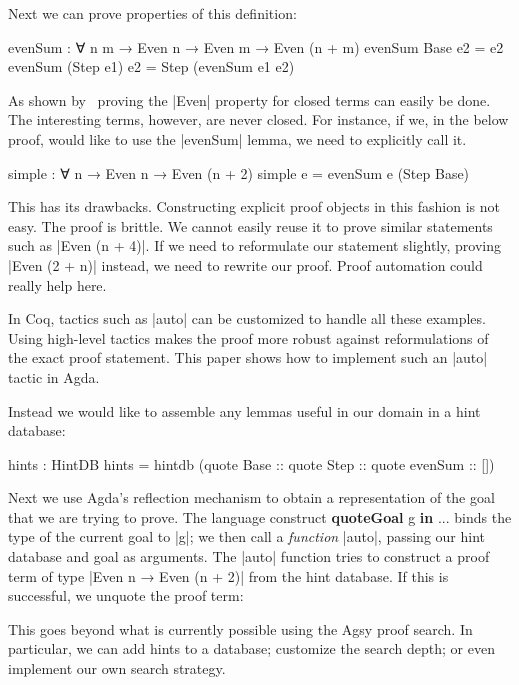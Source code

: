 \documentclass[preprint]{sigplanconf}
\begin{document}
Next we can prove properties of this definition:

\begin{code}
  evenSum : ∀ {n m} → Even n → Even m → Even (n + m)
  evenSum  Base     e2 = e2
  evenSum (Step e1) e2 = Step (evenSum e1 e2)
\end{code}

As shown by~\citet{van-der-walt} proving the |Even| property for closed
terms can easily be done. The interesting terms, however, are never closed.
For instance, if we, in the below proof, would like to use the |evenSum|
lemma, we need to explicitly call it.

\begin{code}
  simple : ∀ {n} → Even n → Even (n + 2)
  simple e =  evenSum e (Step Base)
\end{code}

This has its drawbacks. Constructing explicit proof objects in this
fashion is not easy. The proof is brittle. We cannot easily reuse it
to prove similar statements such as |Even (n + 4)|. If we need to
reformulate our statement slightly, proving |Even (2 + n)| instead, we
need to rewrite our proof. Proof automation could really help here.

In Coq, tactics such as |auto| can be customized to handle all these
examples. Using high-level tactics makes the proof more robust against
reformulations of the exact proof statement. This paper shows how to
implement such an |auto| tactic in Agda.

Instead we would like to assemble any lemmas useful in our domain in a
hint database:

\begin{code}
  hints : HintDB
  hints = hintdb
    (quote Base :: quote Step :: quote evenSum :: [])
\end{code}

Next we use Agda's reflection mechanism to obtain a representation of
the goal that we are trying to prove. The language construct \textbf{quoteGoal}
g \textbf{in} ... binds the type of the current goal to |g|; we then call a
\emph{function} |auto|, passing our hint database and goal as arguments.
The |auto| function tries to construct a proof term of type |Even n → Even
(n + 2)| from the hint database. If this is successful, we unquote the
proof term:

This goes beyond what is currently possible using the Agsy proof search.
In particular, we can add hints to a database; customize the search depth;
or even implement our own search strategy.
\end{document}

